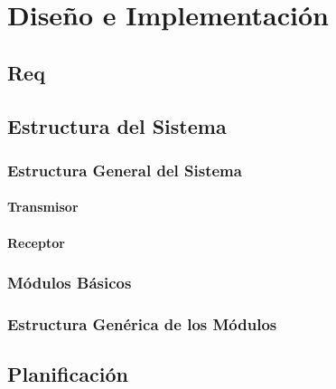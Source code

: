 \chapter{Diseño e Implementación}\label{Chapter3}

\section{Req}

\section{Estructura del Sistema}

\subsection{Estructura General del Sistema}

\subsubsection{Transmisor}

\subsubsection{Receptor}

\subsection{Módulos Básicos}


\subsection{Estructura Genérica de los Módulos}


\section{{Planificación}}

